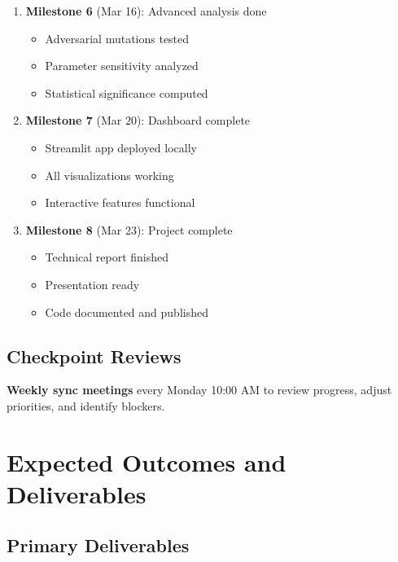 \documentclass[11pt,a4paper]{article}
\begin{document}
\begin{enumerate}[leftmargin=*]
    \item \textbf{Milestone 6} (Mar 16): Advanced analysis done
    \begin{itemize}
        \item Adversarial mutations tested
        \item Parameter sensitivity analyzed
        \item Statistical significance computed
    \end{itemize}
    
    \item \textbf{Milestone 7} (Mar 20): Dashboard complete
    \begin{itemize}
        \item Streamlit app deployed locally
        \item All visualizations working
        \item Interactive features functional
    \end{itemize}
    
    \item \textbf{Milestone 8} (Mar 23): Project complete
    \begin{itemize}
        \item Technical report finished
        \item Presentation ready
        \item Code documented and published
    \end{itemize}
\end{enumerate}

\subsection{Checkpoint Reviews}

\textbf{Weekly sync meetings} every Monday 10:00 AM to review progress, adjust priorities, and identify blockers.

\section{Expected Outcomes and Deliverables}

\subsection{Primary Deliverables}
\end{document}
